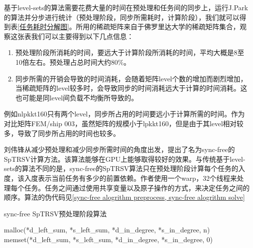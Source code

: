 基于level-sets的算法需要花费大量的时间在预处理和任务间的同步上，运行J.Park的算法并分步进行统计（预处理阶段，同步所需耗时，计算阶段），我们就可以得到表\ref{任务耗时分解图}。所用的稀疏矩阵来自于佛罗里达大学的稀疏矩阵集合\cite{davis2011university}，观察这张表我们可以主要得到以下几点信息：
\begin{enumerate} \setlength{\itemsep}{0pt}
\item 预处理阶段所消耗的时间，要远大于计算阶段所消耗的时间，平均大概是8至10倍左右。预处理占总时间大约80\%。
\item 同步所需的开销会导致的时间消耗，会随着矩阵level个数的增加而剧烈增加，当稀疏矩阵的level较多时，会导致同步的时间消耗远大于计算的时间消耗。这也可能是同level间负载不均衡所导致的。
\end{enumerate}
例如nlpkkt160只有两个level，同步所占用的时间要远小于计算所需的时间。作为对比矩阵FEM/ship 003，虽然矩阵的规模小于lpkkt160，但是由于其level相对较多，导致了同步所占用的时间也较多。

刘伟锋从减少预处理和减少同步所需时间的角度出发，提出了名为sync-free的SpTRSV计算方法\cite{liuSyncFree2016}。该算法能够在GPU上能够取得较好的效果。与传统基于level-sets的算法不同的是，sync-free的SpTRSV算法只在预处理阶段计算每个任务的入度，该入度表示当前任务有多少的前置依赖。作者使用一个warp，32个线程来处理每个任务。任务之间通过使用共享变量以及原子操作的方式，来决定任务之间的顺序。算法的伪代码见\ref{sync-free alogrithm preprocess, sync-free alogrithm solve}

\begin{algorithm}[htbp]
    \caption{sync-free SpTRSV预处理阶段算法}
    \label{sync-free alogrithm preprocess}
    malloc(*d\_left\_sum, *s\_left\_sum, *d\_in\_degree, *s\_in\_degree, n)\;
    memset(*d\_left\_sum, *s\_left\_sum, *d\_in\_degree, *s\_in\_degree, 0)\;
\end{algorithm}

